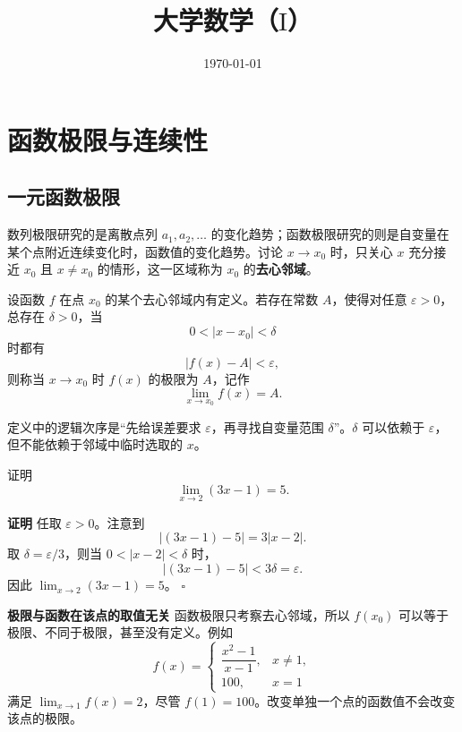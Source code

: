 \documentclass[fontset=fandol]{ctexart}
\title{大学数学（$ \mathrm{I} $）}
\author{}
\date{\today}
\newenvironment{custom}[1]{\par\noindent\textbf{#1}\quad}{\par\vspace{0.8em}}
\newenvironment{proofdetail}{\par\noindent\textbf{证明}\quad}{\hfill$\square$\par\vspace{0.8em}}
\begin{document}
\maketitle
\vspace{-1em}


\section{函数极限与连续性}

\subsection{一元函数极限}

数列极限研究的是离散点列 \(a_1,a_2,\ldots\) 的变化趋势；函数极限研究的则是自变量在某个点附近连续变化时，函数值的变化趋势。讨论 \(x\to x_0\) 时，只关心 \(x\) 充分接近 \(x_0\) 且 \(x\neq x_0\) 的情形，这一区域称为 \(x_0\) 的\textbf{去心邻域}。

\begin{definition}
设函数 \(f\) 在点 \(x_0\) 的某个去心邻域内有定义。若存在常数 \(A\)，使得对任意 \(\varepsilon>0\)，总存在 \(\delta>0\)，当
\[
0<|x-x_0|<\delta
\]
时都有
\[
|f(x)-A|<\varepsilon,
\]
则称当 \(x\to x_0\) 时 \(f(x)\) 的极限为 \(A\)，记作
\[
\lim_{x\to x_0}f(x)=A.
\]
\end{definition}

定义中的逻辑次序是“先给误差要求 \(\varepsilon\)，再寻找自变量范围 \(\delta\)”。\(\delta\) 可以依赖于 \(\varepsilon\)，但不能依赖于邻域中临时选取的 \(x\)。

\begin{example}[按定义证明函数极限]
证明
\[
\lim_{x\to2}(3x-1)=5.
\]
\end{example}
\begin{proofdetail}
任取 \(\varepsilon>0\)。注意到
\[
|(3x-1)-5|=3|x-2|.
\]
取 \(\delta=\varepsilon/3\)，则当 \(0<|x-2|<\delta\) 时，
\[
|(3x-1)-5|<3\delta=\varepsilon.
\]
因此 \(\lim_{x\to2}(3x-1)=5\)。
\end{proofdetail}

\begin{custom}{极限与函数在该点的取值无关}
函数极限只考察去心邻域，所以 \(f(x_0)\) 可以等于极限、不同于极限，甚至没有定义。例如
\[
f(x)=
\begin{cases}
\dfrac{x^2-1}{x-1},&x\neq1,\\
100,&x=1
\end{cases}
\]
满足 \(\lim_{x\to1}f(x)=2\)，尽管 \(f(1)=100\)。改变单独一个点的函数值不会改变该点的极限。
\end{custom}
\end{document}
